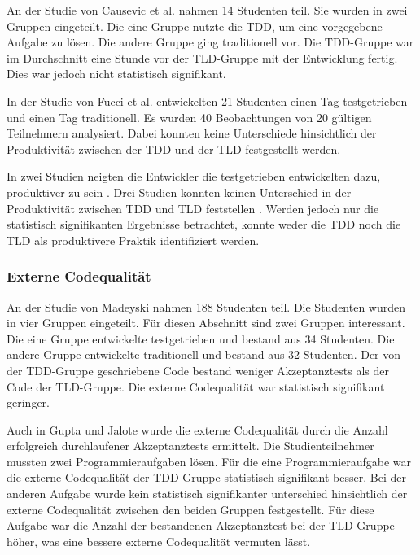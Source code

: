 An der Studie von Causevic et al. \cite{Causevic2012TestExperiment} nahmen 14 Studenten teil. Sie wurden in zwei Gruppen eingeteilt. Die eine Gruppe nutzte die TDD, um eine vorgegebene Aufgabe zu lösen. Die andere Gruppe ging traditionell vor.  Die TDD-Gruppe war im Durchschnitt eine Stunde vor der TLD-Gruppe mit der Entwicklung fertig. Dies war jedoch nicht statistisch signifikant.

In der Studie von Fucci et al. \cite{Fucci2016AnApproach} entwickelten 21 Studenten einen Tag testgetrieben und einen Tag traditionell. Es wurden 40 Beobachtungen von 20 gültigen Teilnehmern analysiert. Dabei konnten keine Unterschiede hinsichtlich der Produktivität zwischen der TDD und der TLD festgestellt werden.

In zwei Studien neigten die Entwickler die testgetrieben entwickelten dazu, produktiver zu sein \cite{Gupta2007AnDevelopment,Causevic2012TestExperiment}. Drei Studien konnten keinen Unterschied in der Produktivität zwischen TDD und TLD feststellen \cite{Gupta2007AnDevelopment,Muller2002ExperimentProgramming,Fucci2016AnApproach}.  Werden jedoch nur die statistisch signifikanten Ergebnisse betrachtet, konnte weder die TDD noch die TLD als produktivere Praktik identifiziert werden.

\subsubsection{Externe Codequalität} An der Studie von Madeyski \cite{Madeyski2005PreliminaryQuality} nahmen 188 Studenten teil. Die Studenten wurden in vier Gruppen eingeteilt. Für diesen Abschnitt sind zwei Gruppen interessant. Die eine Gruppe entwickelte testgetrieben und bestand aus 34 Studenten. Die andere Gruppe entwickelte traditionell und bestand aus 32 Studenten. Der von der TDD-Gruppe geschriebene Code bestand weniger Akzeptanztests als der Code der TLD-Gruppe. Die externe Codequalität war statistisch signifikant geringer.

Auch in Gupta und Jalote  \cite{Gupta2007AnDevelopment} wurde die externe Codequalität durch die Anzahl erfolgreich durchlaufener Akzeptanztests ermittelt. Die Studienteilnehmer mussten zwei Programmieraufgaben lösen. Für die eine Programmieraufgabe war die externe Codequalität der TDD-Gruppe statistisch signifikant besser. Bei der anderen Aufgabe wurde kein statistisch signifikanter unterschied hinsichtlich der externe Codequalität zwischen den beiden Gruppen festgestellt. Für diese Aufgabe war die Anzahl der bestandenen Akzeptanztest bei der TLD-Gruppe höher, was eine bessere externe Codequalität vermuten lässt.

